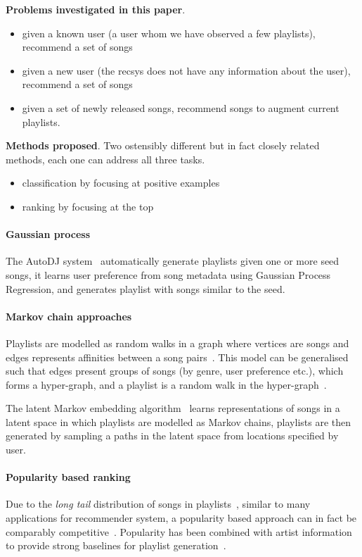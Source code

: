 {\bf Problems investigated in this paper}.
\begin{itemize}
\item given a known user (a user whom we have observed a few playlists), recommend a set of songs
\item given a new user (the recsys does not have any information about the user), recommend a set of songs
\item given a set of newly released songs, recommend songs to augment current playlists.
\end{itemize}

{\bf Methods proposed}.
Two ostensibly different but in fact closely related methods,
each one can address all three tasks.
\begin{itemize}
\item classification by focusing at positive examples
\item ranking by focusing at the top
\end{itemize}




\paragraph{Gaussian process}
The AutoDJ system~\cite{platt2002learning} automatically generate playlists given one or more seed songs, 
it learns user preference from song metadata using Gaussian Process Regression,
and generates playlist with songs similar to the seed.


\paragraph{Markov chain approaches}
Playlists are modelled as random walks in a graph where vertices are songs 
and edges represents affinities between a song pairs~\cite{mcfee2011natural}.
This model can be generalised such that edges present groups of songs (by genre, user preference etc.),
which forms a hyper-graph, and a playlist is a random walk in the hyper-graph~\cite{mcfee2012hypergraph}.

The latent Markov embedding algorithm~\cite{chen2012playlist}
learns representations of songs in a latent space in which playlists are modelled as Markov chains,
playlists are then generated by sampling a paths in the latent space from locations specified by user.

\paragraph{Popularity based ranking}
Due to the \emph{long tail} distribution of songs in playlists~\cite{aoscar2010music},
similar to many applications for recommender system, 
a popularity based approach can in fact be comparably competitive~\cite{cremonesi2010performance}.
Popularity has been combined with artist information to provide strong baselines 
for playlist generation~\cite{mcfee2012million,bonnin2013evaluating,bonnin2015automated}.

